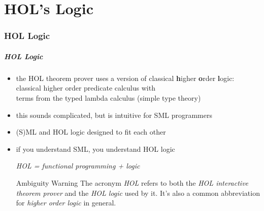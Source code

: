 \part{HOL's Logic}

\frame[plain]{\partpage}


\section{HOL Logic}

\begin{frame}
\frametitle{HOL Logic}
\begin{itemize}
\item the HOL theorem prover uses a version of classical \textbf{h}igher \textbf{o}rder \textbf{l}ogic:\\
classical higher order predicate calculus with \\
terms from the typed lambda calculus (\ie simple type theory)
\item this sounds complicated, but is intuitive for SML programmers
\item (S)ML and HOL logic designed to fit each other
\item if you understand SML, you understand HOL logic

\bigskip
\begin{center}
\emph{HOL = functional programming + logic}
\end{center}
\bigskip

\begin{alertblock}{Ambiguity Warning}
The acronym \textit{HOL} refers to both the \textit{HOL interactive theorem prover} and the \textit{HOL logic} used by it. It's also a common abbreviation for \textit{higher order logic} in general.
\end{alertblock}
\end{itemize}
\end{frame}

